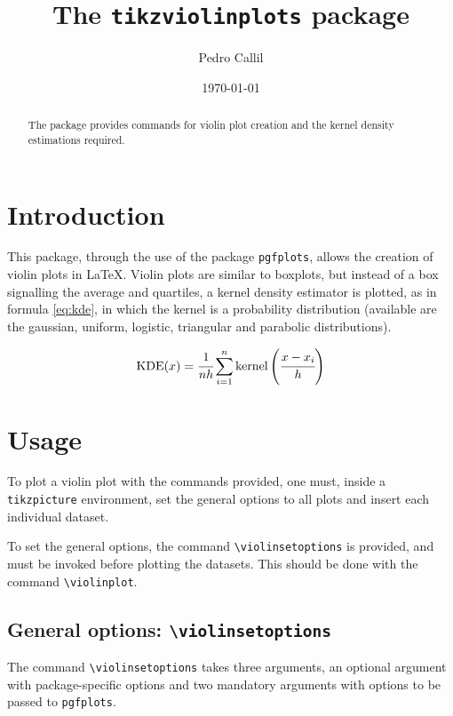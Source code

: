 \documentclass{article}
\title{The \texttt{tikzviolinplots} package}
\author{Pedro Callil}
\date{\today}
\begin{document}
\maketitle

\begin{abstract}
	The package provides commands for violin plot creation and
	the kernel density estimations required.
\end{abstract}

\section{Introduction}

This package, through the use of the package \texttt{pgfplots}, allows the
creation of violin plots in \LaTeX. Violin plots are similar to boxplots,
but instead of a box signalling the average and quartiles, a kernel density
estimator is plotted, as in formula \ref{eq:kde}, in which the kernel is a
probability distribution (available are the gaussian, uniform, logistic,
triangular and parabolic distributions).

\begin{equation}
	\label{eq:kde}
	\textnormal{KDE}(x) = %
	\cfrac{1}{nh}\sum_{i=1}^n\textnormal{kernel}\left(\cfrac{x-x_i}{h}\right)
\end{equation}

\section{Usage}

To plot a violin plot with the commands provided, one must, inside
a \texttt{tikzpicture} environment, set the general options to all
plots and insert each individual dataset.

To set the general options, the command \texttt{{\textbackslash}violinsetoptions}
is provided, and must be invoked before plotting the datasets. This should
be done with the command \texttt{{\textbackslash}violinplot}.

\subsection{General options: \texttt{{\textbackslash}violinsetoptions}}

The command \texttt{{\textbackslash}violinsetoptions} takes three arguments,
an optional argument with package-specific options and two mandatory
arguments with options to be passed to \texttt{pgfplots}.
\end{document}
